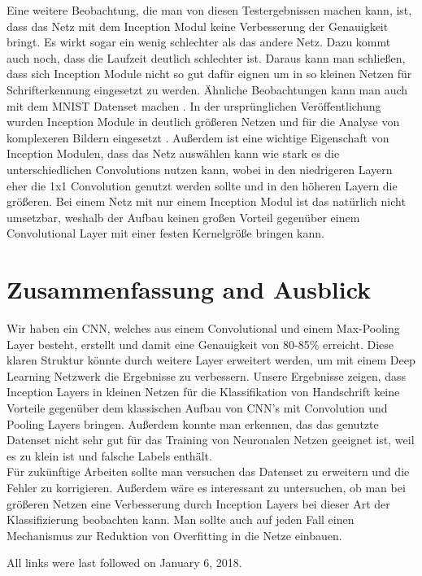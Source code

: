 \documentclass[runningheads,a4paper]{llncs}[2015/06/24]
\begin{document}
Eine weitere Beobachtung, die man von diesen Testergebnissen machen kann, ist, dass das Netz mit dem Inception Modul keine Verbesserung der Genauigkeit bringt. Es wirkt sogar ein wenig schlechter als das andere Netz. Dazu kommt auch noch, dass die Laufzeit deutlich schlechter ist. Daraus kann man schließen, dass sich Inception Module nicht so gut dafür eignen um in so kleinen Netzen für Schrifterkennung eingesetzt zu werden. Ähnliche Beobachtungen kann man auch mit dem MNIST Datenset machen \cite{inception_blog}. In der ursprünglichen Veröffentlichung wurden Inception Module in deutlich größeren Netzen und für die Analyse von komplexeren Bildern eingesetzt \cite{inception_paper}. Außerdem ist eine wichtige Eigenschaft von Inception Modulen, dass das Netz auswählen kann wie stark es die unterschiedlichen Convolutions nutzen kann, wobei in den niedrigeren Layern eher die 1x1 Convolution genutzt werden sollte und in den höheren Layern die größeren. Bei einem Netz mit nur einem Inception Modul ist das natürlich nicht umsetzbar, weshalb der Aufbau keinen großen Vorteil gegenüber einem Convolutional Layer mit einer festen Kernelgröße bringen kann.



\section{Zusammenfassung and Ausblick}
Wir haben ein CNN, welches aus einem Convolutional und einem Max-Pooling Layer besteht, erstellt und damit eine Genauigkeit von 80-85\% erreicht. Diese  klaren Struktur könnte durch weitere Layer erweitert werden, um mit einem Deep Learning Netzwerk die Ergebnisse zu verbessern.
Unsere Ergebnisse zeigen, dass Inception Layers in kleinen Netzen für die Klassifikation von Handschrift keine Vorteile gegenüber dem klassischen Aufbau von CNN's mit Convolution und Pooling Layers bringen. Außerdem konnte man erkennen, das das genutzte Datenset nicht sehr gut für das Training von Neuronalen Netzen geeignet ist, weil es zu klein ist und falsche Labels enthält.\\
Für zukünftige Arbeiten sollte man versuchen das Datenset zu erweitern und die Fehler zu korrigieren. Außerdem wäre es interessant zu untersuchen, ob man bei größeren Netzen eine Verbesserung durch Inception Layers bei dieser Art der Klassifizierung beobachten kann. Man sollte auch auf jeden Fall einen Mechanismus zur Reduktion von Overfitting in die Netze einbauen.






All links were last followed on January 6, 2018.
\end{document}

